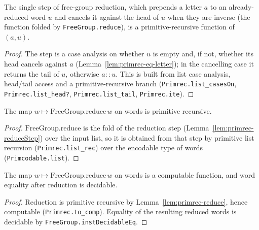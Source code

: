 \begin{lemma}
    \label{lem:primrec-reduceStep}
    \leanok
    The single step of free-group reduction, which prepends a letter $a$ to an
    already-reduced word $u$ and cancels it against the head of $u$ when they are
    inverse (the function folded by \texttt{FreeGroup.reduce}), is a
    primitive-recursive function of $(a, u)$.
\end{lemma}
\begin{proof}
    The step is a case analysis on whether $u$ is empty and, if not, whether its
    head cancels against $a$ (Lemma~\ref{lem:primrec-eq-letter}); in the
    cancelling case it returns the tail of $u$, otherwise $a :: u$. This is built
    from list case analysis, head/tail access and a primitive-recursive branch
    (\texttt{Primrec.list\_casesOn}, \texttt{Primrec.list\_head?},
    \texttt{Primrec.list\_tail}, \texttt{Primrec.ite}).
\end{proof}

\begin{lemma}
    \label{lem:primrec-reduce}
    \leanok
    The map $w \mapsto \mathrm{FreeGroup.reduce}\,w$ on words is primitive
    recursive.
\end{lemma}
\begin{proof}
    $\mathrm{FreeGroup.reduce}$ is the fold of the reduction step
    (Lemma~\ref{lem:primrec-reduceStep}) over the input list, so it is obtained
    from that step by primitive list recursion (\texttt{Primrec.list\_rec}) over
    the encodable type of words (\texttt{Primcodable.list}).
\end{proof}

\begin{lemma}
    \label{lem:reduce-computable}
    \leanok
    The map $w \mapsto \mathrm{FreeGroup.reduce}\,w$ on words is a computable
    function, and word equality after reduction is decidable.
\end{lemma}
\begin{proof}
    Reduction is primitive recursive by Lemma~\ref{lem:primrec-reduce}, hence
    computable (\texttt{Primrec.to\_comp}). Equality of the resulting reduced
    words is decidable by \texttt{FreeGroup.instDecidableEq}.
\end{proof}


